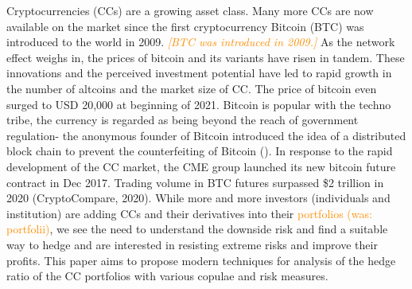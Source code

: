 \documentclass[11pt,a4paper,english]{article}
\providecommand{\natp}[1]{\textcolor{darkorange}{#1}}
\begin{document}
Cryptocurrencies (CCs) are a growing asset class.
Many more CCs are now available on the market since the first
cryptocurrency Bitcoin (BTC) was introduced to the world in 2009. \natp{\em [BTC was introduced in 2009.]} As the network effect weighs in, the prices of bitcoin and its variants have risen in tandem. These innovations and the perceived investment potential have led to rapid growth in the number of altcoins and the market size of CC. The price of bitcoin even surged to USD 20,000 at beginning of 2021. 
Bitcoin is popular with the techno tribe, the currency is regarded as being beyond the reach of government regulation- the anonymous founder of Bitcoin introduced the idea of a distributed block chain to prevent the counterfeiting of Bitcoin (\citealp{ong2015evaluating}).  In response to the rapid development of the CC market, the CME group launched its new bitcoin future contract in Dec 2017. Trading volume in BTC futures surpassed \$2 trillion in 2020 (CryptoCompare, 2020).
While more and more investors (individuals and institution) are adding
CCs and their derivatives into their \natp{portfolios (was: portfolii)}, 
we see the need to understand the downside risk and find a suitable way to hedge and are interested in resisting extreme risks and improve their profits. This paper aims to propose modern techniques for analysis of the hedge ratio of the CC portfolios with various copulae and risk measures.\\
\end{document}
